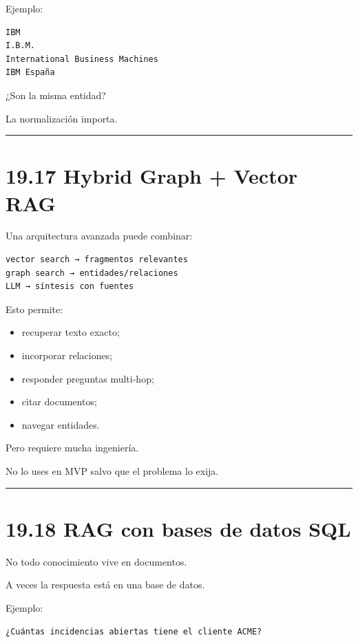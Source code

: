 Ejemplo:

\begin{lstlisting}
IBM
I.B.M.
International Business Machines
IBM España
\end{lstlisting}

¿Son la misma entidad?

La normalización importa.

\begin{center}\rule{0.5\linewidth}{0.5pt}\end{center}

\section{19.17 Hybrid Graph + Vector RAG}\label{hybrid-graph-vector-rag}

Una arquitectura avanzada puede combinar:

\begin{lstlisting}
vector search → fragmentos relevantes
graph search → entidades/relaciones
LLM → síntesis con fuentes
\end{lstlisting}

Esto permite:

\begin{itemize}
\tightlist
\item
  recuperar texto exacto;
\item
  incorporar relaciones;
\item
  responder preguntas multi-hop;
\item
  citar documentos;
\item
  navegar entidades.
\end{itemize}

Pero requiere mucha ingeniería.

No lo uses en MVP salvo que el problema lo exija.

\begin{center}\rule{0.5\linewidth}{0.5pt}\end{center}

\section{19.18 RAG con bases de datos
SQL}\label{rag-con-bases-de-datos-sql}

No todo conocimiento vive en documentos.

A veces la respuesta está en una base de datos.

Ejemplo:

\begin{lstlisting}
¿Cuántas incidencias abiertas tiene el cliente ACME?
\end{lstlisting}

